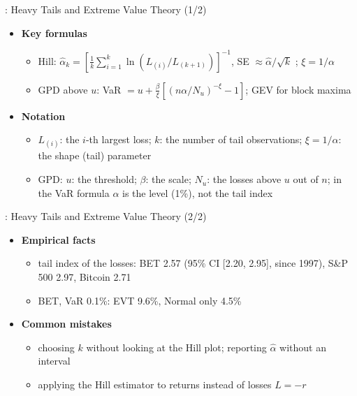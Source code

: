 \begin{frame}{: Heavy Tails and Extreme Value Theory (1/2)}
\itemsize{\small}
\begin{itemize}
    \item \textbf{Key formulas}
    \begin{itemize}
        \item Hill: $\hat\alpha_k = [\frac1k\sum_{i=1}^k \ln(L_{(i)}/L_{(k+1)})]^{-1}$, SE $\approx \hat\alpha/\sqrt{k}$ ; $\xi = 1/\alpha$
        \item GPD above $u$: VaR $= u + \frac{\beta}{\xi}[(n\alpha/N_u)^{-\xi} - 1]$; GEV for block maxima
    \end{itemize}
    \item \textbf{Notation}
    \begin{itemize}
        \item $L_{(i)}$: the $i$-th largest loss; $k$: the number of tail observations; $\xi = 1/\alpha$: the shape (tail) parameter
        \item GPD: $u$: the threshold; $\beta$: the scale; $N_u$: the losses above $u$ out of $n$; in the VaR formula $\alpha$ is the level (1\%), not the tail index
    \end{itemize}
\end{itemize}
\end{frame}

\begin{frame}{: Heavy Tails and Extreme Value Theory (2/2)}
\itemsize{\small}
\begin{itemize}
    \item \textbf{Empirical facts}
    \begin{itemize}
        \item tail index of the losses: BET 2.57 (95\% CI [2.20, 2.95], since 1997), S\&P 500 2.97, Bitcoin 2.71
        \item BET, VaR 0.1\%: EVT 9.6\%, Normal only 4.5\%
    \end{itemize}
    \item \textbf{Common mistakes}
    \begin{itemize}
        \item choosing $k$ without looking at the Hill plot; reporting $\hat\alpha$ without an interval
        \item applying the Hill estimator to returns instead of losses $L = -r$
    \end{itemize}
\end{itemize}
\end{frame}

